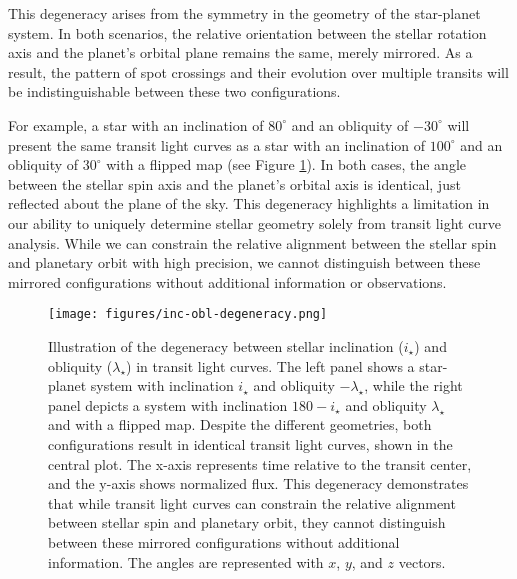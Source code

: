 \documentclass[twocolumn]{aastex631}
\begin{document}
This degeneracy arises from the symmetry in the geometry of the star-planet system. In both scenarios, the relative orientation between the stellar 
rotation axis and the planet's orbital plane remains the same, merely mirrored. As a result, the pattern of spot crossings and their evolution over 
multiple transits will be indistinguishable between these two configurations.

For example, a star with an inclination of $80^\circ$ and an obliquity of $-30^\circ$ will present the same transit light curves 
as a star with an inclination of $100^\circ$ and an obliquity of $30^\circ$ with a flipped map (see Figure \ref{fig:inc-obliquity-degeneracy}). 
In both cases, the angle between the stellar spin axis and the planet's orbital axis is identical, just reflected about the plane of the sky.
This degeneracy highlights a limitation in our ability to uniquely determine stellar geometry solely from transit light curve analysis. 
While we can constrain the relative alignment between the stellar spin and planetary orbit with high precision, we cannot distinguish between these 
mirrored configurations without additional information or observations.


\begin{figure}[hbt!]
    \begin{centering}
        \texttt{[image: figures/inc-obl-degeneracy.png]}
        \caption{
            Illustration of the degeneracy between stellar inclination ($i_\star$) and obliquity ($\lambda_\star$) in transit light curves. 
            The left panel shows a star-planet system with inclination $i_\star$ and obliquity $-\lambda_\star$, while the right panel 
            depicts a system with inclination $180-i_\star$ and obliquity $\lambda_\star$ and with a flipped map. 
            Despite the different geometries, both configurations result in identical transit light curves, shown in the central plot. 
            The x-axis represents time relative to the transit center, and the y-axis shows normalized flux. 
            This degeneracy demonstrates that while transit light curves can constrain the relative alignment between stellar spin and planetary orbit, 
            they cannot distinguish between these mirrored configurations without additional information. 
            The angles are represented with $x$, $y$, and $z$ vectors.
        }
        \label{fig:inc-obliquity-degeneracy}
    \end{centering}
\end{figure}
\end{document}

